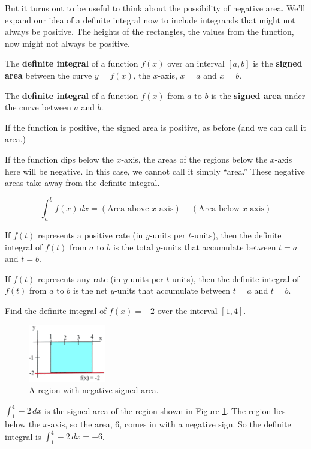 But it turns out to be useful to think about the possibility of negative area. We’ll expand our idea of a definite integral now to include integrands that might not always be positive. The heights of the rectangles, the values from the function, now might not always be positive.

\begin{definition}
The {\bf definite integral} of a function $f(x)$ over an interval $[a,b]$ is the {\bf signed area} between the curve $y=f(x)$, the $x$-axis, $x=a$ and $x=b$.

The {\bf definite integral} of a function $f(x)$ from $a$ to $b$ is the {\bf signed area} under the curve between $a$ and $b$.
\end{definition}
If the function is positive, the signed area is positive, as before (and we can call it area.)

If the function dips below the $x$-axis, the areas of the regions below the $x$-axis here will be negative. In this case, we cannot call it simply ``area.'' These negative areas take away from the definite integral.

$$\int_a^bf(x)\,dx = (\text{Area above } x\text{-axis}) - (\text{Area below }x\text{-axis})$$

If $f(t)$ represents a positive rate (in $y$-units per $t$-units), then the definite integral of $f(t)$ from $a$ to $b$ is the total $y$-units that accumulate between $t=a$ and $t=b$.

If $f(t)$ represents any rate (in $y$-units per $t$-units), then the definite integral of $f(t)$ from $a$ to $b$ is the net $y$-units that accumulate between $t=a$ and $t=b$.

\begin{example}
Find the definite integral of $f(x)=-2$ over the interval $[1,4]$.

\begin{figure}[!ht]
  \centering
    \includegraphics[width=0.3\textwidth]{img/chap5/image012.png}
    \caption{A region with negative signed area.}
    \label{fig:5-3-negative}
\end{figure}

\begin{solution}
$\displaystyle\int_1^4 -2\,dx$ is the signed area of the region shown in Figure \ref{fig:5-3-negative}. The region lies below the $x$-axis, so the area, 6, comes in with a negative sign. So the definite integral is $\displaystyle\int_1^4-2\,dx = -6$.
\end{solution}\end{example}

